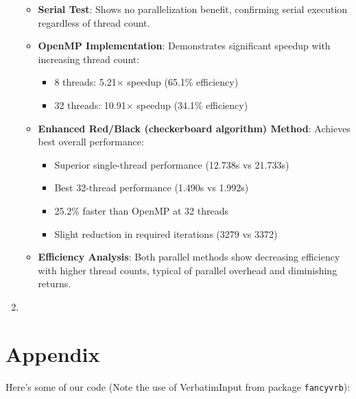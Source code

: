 \documentclass[11pt]{article}
\begin{document}
\begin{enumerate}
{  \begin{itemize}
    \item \textbf{Serial Test}: Shows no parallelization benefit, confirming serial execution regardless of thread count.
    
    \item \textbf{OpenMP Implementation}: Demonstrates significant speedup with increasing thread count:
      \begin{itemize}
      \item 8 threads: 5.21$\times$ speedup (65.1\% efficiency)
      \item 32 threads: 10.91$\times$ speedup (34.1\% efficiency)
      \end{itemize}
    
    \item \textbf{Enhanced Red/Black (checkerboard algorithm) Method}: Achieves best overall performance:
      \begin{itemize}
      \item Superior single-thread performance (12.738s vs 21.733s)
      \item Best 32-thread performance (1.490s vs 1.992s)
      \item 25.2\% faster than OpenMP at 32 threads
      \item Slight reduction in required iterations (3279 vs 3372)
      \end{itemize}
    
    \item \textbf{Efficiency Analysis}: Both parallel methods show decreasing efficiency with higher thread counts, typical of parallel overhead and diminishing returns.
  
  \end{itemize}
}


\item{
  
}

\end{enumerate}
%

\newpage{}




 


\newpage

\section{Appendix}

Here's some of our code (Note the use of VerbatimInput from package \texttt{fancyvrb}):
\end{document}

